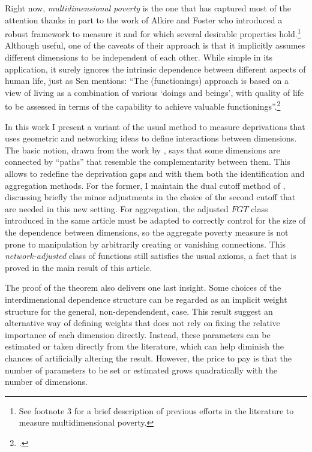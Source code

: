 \documentclass[english, a4paper,12pt]{article}
\begin{document}
Right now, \textit{multidimensional poverty} is the one that has captured most of the attention thanks in part to the work of Alkire and Foster who introduced a robust framework to measure it and for which several desirable properties hold.\footnote{See \cite{AlkireFoster11} footnote 3 for a brief description of previous efforts in the literature to measure multidimensional poverty.} Although useful, one of the caveats of their approach is that it implicitly assumes different dimensions to be independent of each other. While simple in its application, it surely ignores the intrinsic dependence between different aspects of human life, just as Sen mentions: ``The (functionings) approach is based on a view of living as a combination of various ‘doings and beings’, with quality of life to be assessed in terms of the capability to achieve valuable functionings''.\footnote{\cite{SenFunctionings}.} 

In this work I present a variant of the usual method to measure deprivations that uses geometric and networking ideas to define interactions between dimensions. The basic notion, drawn from the work by \cite{BizarrePaper}, says that some dimensions are connected by ``paths'' that resemble the complementarity between them. This allows to redefine the deprivation gaps and with them both the identification and aggregation methods. For the former, I maintain the dual cutoff method of \cite{AlkireFoster11}, discussing briefly the minor adjustments in the choice of the second cutoff that are needed in this new setting. For aggregation, the adjusted $FGT$ class introduced in the same article must be adapted to correctly control for the size of the dependence between dimensions, so the aggregate poverty measure is not prone to manipulation by arbitrarily creating or vanishing connections. This \textit{network-adjusted} class of functions still satisfies the usual axioms, a fact that is proved in the main result of this article. 

The proof of the theorem also delivers one last insight. Some choices of the interdimensional dependence structure can be regarded as an implicit weight structure for the general, non-dependendent, case. This result suggest an alternative way of defining weights that does not rely on fixing the relative importance of each dimension directly. Instead, these parameters can be estimated or taken directly from the literature, which can help diminish the chances of artificially altering the result. However, the price to pay is that the number of parameters to be set or estimated grows quadratically with the number of dimensions. 
\end{document}

